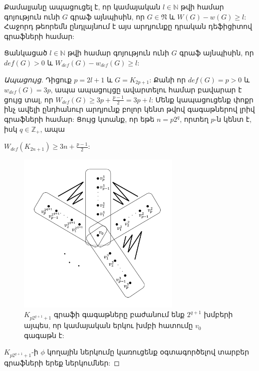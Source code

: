 Քամալյանը ապացուցել է, որ կամայական $l\in \mathbb{N}$ թվի համար գոյություն ունի $G$ գրաֆ այնպիսին, որ $G\in \mathfrak{N}$ և $W(G)-w(G)\geq l$: Հաջորդ թեորեմն ընդլայնում է այս արդյունքը դրական դեֆիցիտով գրաֆների համար:
\begin{theorem}
\label{t3_Wdef_wdef_difference} Ցանկացած $l\in \mathbb{N}$ թվի համար գոյություն ունի $G$ գրաֆ այնպիսին, որ $def(G)>0$ և $W_{def}(G)-w_{def}(G)\geq l$:
\end{theorem}
\begin{proof}[Ապացույց]
Դիցուք $p=2l+1$ և $G=K_{2p+1}$: Քանի որ $def(G)=p>0$ և $w_{def}(G)=3p$, ապա ապացույցը ավարտելու համար բավարար է ցույց տալ, որ $W_{def}(G) \geq 3p + \frac{p-1}{2} = 3p + l$: Մենք կապացուցենք փոքր ինչ ավելի ընդհանուր արդյունք բոլոր կենտ թվով գագաթներով լրիվ գրաֆների համար: Ցույց կտանք, որ եթե $n = p2^q$, որտեղ $p$-ն կենտ է, իսկ $q \in \mathbb{Z}_+$, ապա
\begin{center}
$W_{def}(K_{2n+1}) \geq 3n + \frac{p-1}{2}$:
\end{center}

\begin{figure}[t!]
\centering
\includegraphics[width=0.7\textwidth]{figures/complete-graph-edges.pdf}
\caption{$K_{p2^{q+1}+1}$ գրաֆի գագաթները բաժանում ենք $2^{q+1}$ խմբերի այպես, որ կամայական երկու խմբի հատումը $v_0$ գագաթն է:}
\label{complete-graph}
\end{figure}

$K_{p2^{q+1}+1}$-ի $\phi$ կողային ներկումը կառուցենք օգտագործելով %
տարբեր գրաֆների երեք ներկումներ:


\end{proof}
